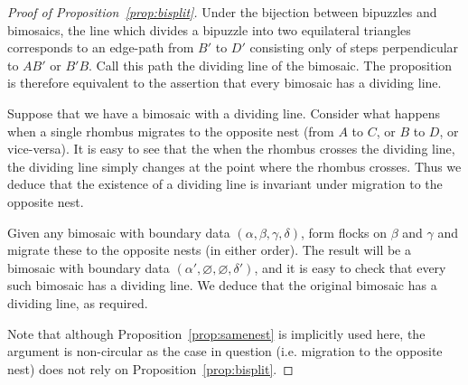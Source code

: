 \begin{proof}[Proof of Proposition~\ref{prop:bisplit}]
Under the bijection between bipuzzles and bimosaics, the
line which divides a bipuzzle into two equilateral triangles
corresponds to an edge-path from
$B'$ to $D'$ consisting only of steps perpendicular to $AB'$ or
$B'B$.  Call this path the dividing line of the bimosaic.
The proposition is therefore equivalent to the assertion
that every bimosaic has a dividing line.

Suppose that we have a bimosaic with a dividing line. 
Consider what happens when a single rhombus migrates to the opposite
nest (from $A$ to $C$, or $B$ to $D$, or vice-versa).  
It is easy to see that the when the rhombus
crosses the dividing line, the dividing line simply changes at the
point where the rhombus crosses.  Thus we deduce that the existence of 
a dividing line is invariant under migration to the opposite nest.

Given any bimosaic with boundary data $(\alpha, \beta, \gamma, \delta)$,
form flocks on $\beta$ and $\gamma$ and migrate these to the opposite
nests (in either order).  The result will be a bimosaic with
boundary data $(\alpha', \varnothing, \varnothing, \delta')$, and it is easy
to check that every such bimosaic has a dividing line.  We deduce that
the original bimosaic has a dividing line, as required.

Note that although Proposition~\ref{prop:samenest} 
is implicitly used here, the argument is non-circular as the case
in question (i.e. migration to the opposite nest)
does not rely on Proposition~\ref{prop:bisplit}.
\end{proof}

